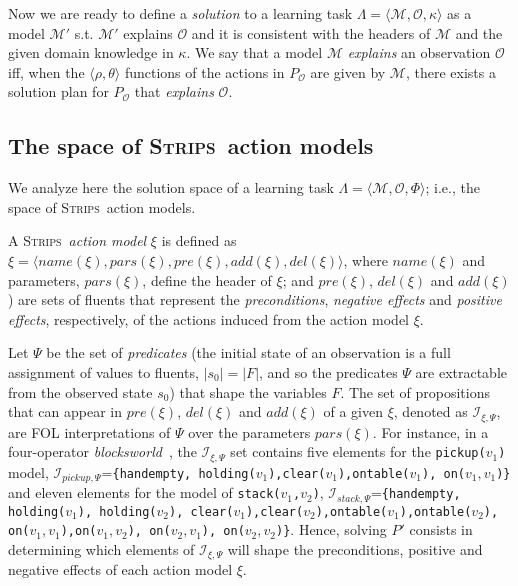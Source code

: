 \documentclass[runningheads]{llncs}
\newcommand{\tup}[1]{{\langle #1 \rangle}}
\newcommand{\strips}{\textsc{Strips}}     %
\begin{document}
Now we are ready to define a {\em solution} to a learning task $\Lambda=\tup{\mathcal{M},{\mathcal O},\kappa}$ as a model $\mathcal{M}'$ s.t. $\mathcal{M}'$ explains $\mathcal{O}$ and it is consistent with the headers of $\mathcal{M}$ and the given domain knowledge in $\kappa$. We say that a model $\mathcal{M}$ {\em explains} an observation $\mathcal{O}$ iff, when the $\tup{\rho,\theta}$ functions of the actions in $P_\mathcal{O}$ are given by $\mathcal{M}$, there exists a solution plan for $P_\mathcal{O}$ that {\em explains} $\mathcal{O}$.  



\subsection{The space of \strips\ action models}
We analyze here the solution space of a learning task $\Lambda=\tup{\mathcal{M},{\mathcal O},\Phi}$; i.e., the space of \strips\ action models.

A \strips\ \emph{action model} $\xi$ is defined as $\xi=\tup{name(\xi),pars(\xi),pre(\xi),add(\xi),del(\xi)}$, where $name(\xi)$ and parameters, $pars(\xi)$, define the header of $\xi$; and $pre(\xi)$, $del(\xi)$ and $add(\xi)$) are sets of fluents that represent the {\em preconditions}, {\em negative effects} and {\em positive effects}, respectively, of the actions induced from the action model $\xi$.

Let $\Psi$ be the set of {\em predicates} (the initial state of an observation is a full assignment of values to fluents, $|s_0|=|F|$, and so the predicates $\Psi$ are extractable from the observed state $s_0$) that shape the variables $F$. The set of propositions that can appear in $pre(\xi)$, $del(\xi)$ and $add(\xi)$ of a given $\xi$, denoted as ${\mathcal I}_{\xi,\Psi}$, are FOL interpretations of $\Psi$ over the parameters $pars(\xi)$. For instance, in a four-operator {\em blocksworld}~\cite{slaney2001blocks}, the ${\mathcal I}_{\xi,\Psi}$ set contains five elements for the {\small \tt pickup($v_1$)} model, ${\mathcal I}_{pickup,\Psi}$={\small\tt\{handempty, holding($v_1$),clear($v_1$),ontable($v_1$), on($v_1,v_1$)\}} and eleven elements for the model of {\small \tt stack($v_1$,$v_2$)}, ${\mathcal I}_{stack,\Psi}$={\small\tt\{handempty, holding($v_1$), holding($v_2$), clear($v_1$),clear($v_2$),ontable($v_1$),ontable($v_2$), \\
on($v_1,v_1$),on($v_1,v_2$), on($v_2,v_1$), on($v_2,v_2$)\}}. Hence, solving $P'$ consists in determining which elements of ${\mathcal I}_{\xi,\Psi}$ will shape the preconditions, positive and negative effects of each action model $\xi$.
\end{document}
